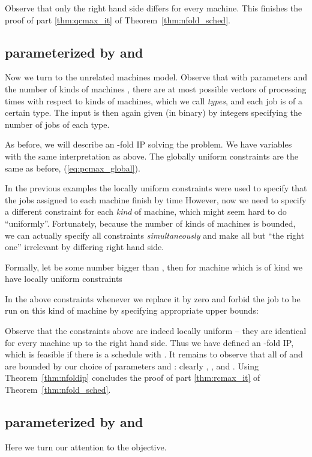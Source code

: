 \documentclass{llncs}
\begin{document}
Observe that only the right hand side differs for every machine. This finishes the proof of part \eqref{thm:qcmax_it} of Theorem~\ref{thm:nfold_sched}.

\subsection{ parameterized by  and }

Now we turn to the unrelated machines model. Observe that with parameters  and the number of kinds of machines , there are at most  possible vectors  of processing times with respect to kinds of machines, which we call \textit{types}, and each job is of a certain type. The input is then again given (in binary) by  integers  specifying the number of jobs of each type.

As before, we will describe an -fold IP solving the problem. We have  variables  with the same interpretation as above. The globally uniform constraints are the same as before, (\ref{eq:pcmax_global}).

In the previous examples the locally uniform constraints were used to specify that the jobs assigned to each machine finish by time  However, now we need to specify a different constraint for each \textit{kind} of machine, which might seem hard to do ``uniformly''. Fortunately, because the number of kinds of machines is bounded, we can actually specify all constraints \textit{simultaneously} and make all but ``the right one'' irrelevant by differing right hand side.

Formally, let  be some number bigger than , then for machine  which is of kind  we have locally uniform constraints

In the above constraints whenever  we replace it by zero and forbid the job to be run on this kind of machine by specifying appropriate upper bounds:

Observe that the constraints above are indeed locally uniform -- they are identical for every machine up to the right hand side. Thus we have defined an -fold IP, which is feasible if there is a schedule with . It remains to observe that all of  and  are bounded by our choice of parameters  and : clearly , ,  and . Using Theorem~\ref{thm:nfoldip} concludes the proof of part \eqref{thm:rcmax_it} of Theorem~\ref{thm:nfold_sched}.

\subsection{ parameterized by  and }
Here we turn our attention to the  objective.
\end{document}
